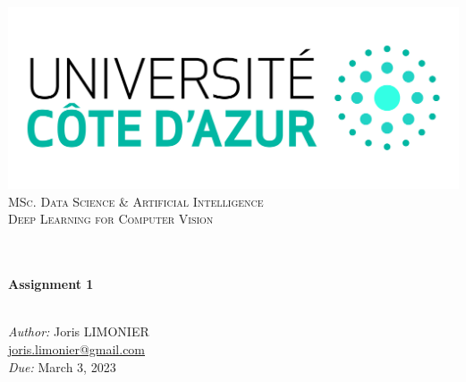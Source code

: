 \begin{titlepage}
	\begin{center}
		\includegraphics[width=\textwidth]{images/logo_uca.jpeg}\\[0.1cm]
		\vspace{1.5cm}
		\textsc{\Large MSc. Data Science \& Artificial Intelligence}\\[1.2cm]
		\textsc{\Large Deep Learning for Computer Vision}\\[1.2cm]
		\\
		\vspace{1cm}

		\HRule \\[0.6cm]
		{\huge \bfseries Assignment 1}\\[0.3cm]
		\HRule \\[1.8cm]
		\vfill

		\large
		\emph{Author:} Joris LIMONIER\\[.2cm]
		\href{mailto:joris.limonier@gmail.com}{\color{black}joris.limonier@gmail.com} \\[.2cm]
		\emph{Due:} {\large March 3, 2023}
	\end{center}
\end{titlepage}


